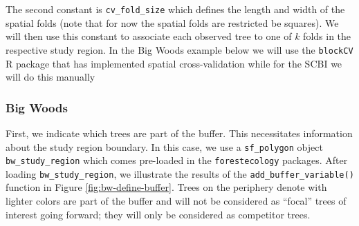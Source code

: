 \documentclass[12pt]{article}
\newenvironment{Shaded}{\begin{snugshade}}{\end{snugshade}}
\newcommand{\DataTypeTok}[1]{\textcolor[rgb]{0.13,0.29,0.53}{#1}}
\newcommand{\FloatTok}[1]{\textcolor[rgb]{0.00,0.00,0.81}{#1}}
\newcommand{\KeywordTok}[1]{\textcolor[rgb]{0.13,0.29,0.53}{\textbf{#1}}}
\newcommand{\NormalTok}[1]{#1}
\newcommand{\OperatorTok}[1]{\textcolor[rgb]{0.81,0.36,0.00}{\textbf{#1}}}
\newcommand{\StringTok}[1]{\textcolor[rgb]{0.31,0.60,0.02}{#1}}
\begin{document}
The second constant is \texttt{cv\_fold\_size} which defines the length
and width of the spatial folds (note that for now the spatial folds are
restricted be squares). We will then use this constant to associate each
observed tree to one of \(k\) folds in the respective study region. In
the Big Woods example below we will use the \texttt{blockCV} R package
that has implemented spatial cross-validation while for the SCBI we will
do this manually \citet{valavi_blockcv_2019}

\hypertarget{big-woods-2}{%
\subsubsection{Big Woods}\label{big-woods-2}}

First, we indicate which trees are part of the buffer. This necessitates
information about the study region boundary. In this case, we use a
\texttt{sf\_polygon} object \texttt{bw\_study\_region} which comes
pre-loaded in the \texttt{forestecology} packages. After loading
\texttt{bw\_study\_region}, we illustrate the results of the
\texttt{add\_buffer\_variable()} function in Figure
\ref{fig:bw-define-buffer}. Trees on the periphery denote with lighter
colors are part of the buffer and will not be considered as ``focal''
trees of interest going forward; they will only be considered as
competitor trees.

\begin{Shaded}
\end{Shaded}
\end{document}
